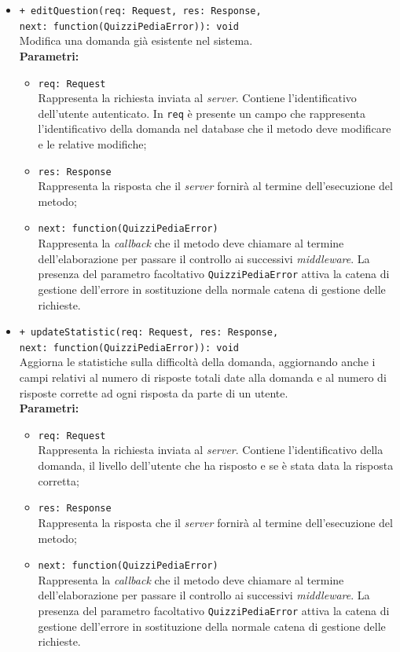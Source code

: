 \begin{itemize}
\begin{itemize}
				\item \texttt{+ editQuestion(req: Request, res: Response,\\ next: function(QuizziPediaError)): void} \\
				Modifica una domanda già esistente nel sistema. \\
				\textbf{Parametri:}
					\begin{itemize}
						\item \texttt{req: Request} \\
						Rappresenta la richiesta inviata al \textit{server}. Contiene l'identificativo dell'utente autenticato. In \texttt{req} è presente un campo che rappresenta l'identificativo della domanda nel database che il metodo deve modificare e le relative modifiche;
						\item \texttt{res: Response} \\
						Rappresenta la risposta che il \textit{server} fornirà al termine dell'esecuzione del metodo;
						\item \texttt{next: function(QuizziPediaError)} \\
						Rappresenta la \textit{callback} che il metodo deve chiamare al termine dell'elaborazione per passare il controllo ai successivi \textit{middleware}. La presenza del parametro facoltativo \texttt{QuizziPediaError} attiva la catena di gestione dell'errore in sostituzione della normale catena di gestione delle richieste.
					\end{itemize}
					
				\item \texttt{+ updateStatistic(req: Request, res: Response,\\ next: function(QuizziPediaError)): void} \\
				Aggiorna le statistiche sulla difficoltà della domanda, aggiornando anche i campi relativi al numero di risposte totali date alla domanda e al numero di risposte corrette ad ogni risposta da parte di un utente. \\
				\textbf{Parametri:}
					\begin{itemize}
						\item \texttt{req: Request} \\
						Rappresenta la richiesta inviata al \textit{server}. Contiene l'identificativo della domanda, il livello dell'utente che ha risposto e se è stata data la risposta corretta;
						\item \texttt{res: Response} \\
						Rappresenta la risposta che il \textit{server} fornirà al termine dell'esecuzione del metodo;
						\item \texttt{next: function(QuizziPediaError)} \\
						Rappresenta la \textit{callback} che il metodo deve chiamare al termine dell'elaborazione per passare il controllo ai successivi \textit{middleware}. La presenza del parametro facoltativo \texttt{QuizziPediaError} attiva la catena di gestione dell'errore in sostituzione della normale catena di gestione delle richieste.
					\end{itemize}
					

\end{itemize}
\end{itemize}
